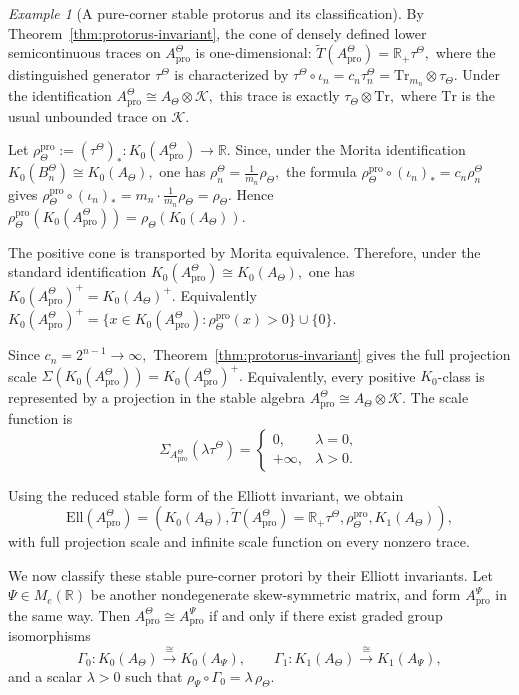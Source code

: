 \documentclass[11pt]{amsart}
\theoremstyle{definition}
\theoremstyle{remark}
\newtheorem{example}[theorem]{Example}
\newcommand{\R}{\mathbb{R}}
\newcommand{\K}{\ensuremath{\mathcal{K}}}
\newcommand{\Tr}{\mathrm{Tr}}
\newcommand{\Ell}{\mathrm{Ell}}
\newcommand{\ex}{\mathrm{pro}}
\begin{document}
\begin{example}[A pure-corner stable protorus and its classification]
By Theorem~\ref{thm:protorus-invariant}, the cone of densely defined lower
semicontinuous traces on \(A_{\ex}^{\Theta}\) is one-dimensional: $\widetilde T(A_{\ex}^{\Theta})=\R_+\tau^\Theta,$
where the distinguished generator $\tau^\Theta$ is characterized by
$\tau^\Theta\circ\iota_n=c_n\tau_n^\Theta=
\Tr_{m_n}\otimes\tau_\Theta.$
Under the identification $A_{\ex}^{\Theta}\cong A_\Theta\otimes\K,$
this trace is exactly $\tau_\Theta\otimes\Tr,$
where $\Tr$ is the usual unbounded trace on $\K$.

Let $\rho_{\Theta}^{\ex}:=(\tau^\Theta)_*
\colon K_0(A_{\ex}^{\Theta})\to\R.$
Since, under the Morita identification $K_0(B_n^\Theta)\cong K_0(A_\Theta),$
one has $
\rho_n^\Theta
=
\frac{1}{m_n}\rho_\Theta,$
the formula $
\rho_{\Theta}^{\ex}\circ(\iota_n)_*=c_n\rho_n^\Theta$
gives $\rho_{\Theta}^{\ex}\circ(\iota_n)_*=
m_n\cdot\frac{1}{m_n}\rho_\Theta=\rho_\Theta.$
Hence $\rho_{\Theta}^{\ex}(K_0(A_{\ex}^{\Theta}))
=
\rho_\Theta(K_0(A_\Theta)).$

The positive cone is transported by Morita equivalence. Therefore, under the
standard identification $K_0(A_{\ex}^{\Theta})\cong K_0(A_\Theta),$
one has $K_0(A_{\ex}^{\Theta})^+
=
K_0(A_\Theta)^+.$
Equivalently $K_0(A_{\ex}^{\Theta})^+
=
\{x\in K_0(A_{\ex}^{\Theta}):\rho_{\Theta}^{\ex}(x)>0\}
\cup\{0\}.$

Since $c_n=2^{n-1}\to\infty,$
Theorem~\ref{thm:protorus-invariant} gives the full projection scale $\Sigma(K_0(A_{\ex}^{\Theta}))
=
K_0(A_{\ex}^{\Theta})^+.$
Equivalently, every positive \(K_0\)-class is represented by a projection in
the stable algebra $A_{\ex}^{\Theta}\cong A_\Theta\otimes\K.$
The scale function is
\[
\Sigma_{A_{\ex}^{\Theta}}(\lambda\tau^\Theta)
=
\begin{cases}
0, & \lambda=0,\\
+\infty, & \lambda>0.
\end{cases}
\]

Using the reduced stable form of the Elliott invariant, we obtain
\[
\Ell(A_{\ex}^{\Theta})
=
\left(
K_0(A_\Theta),
\widetilde T(A_{\ex}^{\Theta})=\mathbb R_+\tau^\Theta,
\rho_{\Theta}^{\ex},
K_1(A_\Theta)
\right),
\]
with full projection scale and infinite scale function on every nonzero trace.

We now classify these stable pure-corner protori by their Elliott invariants.
Let $\Psi\in M_e(\R)$ be another nondegenerate skew-symmetric matrix, and form $A_{\ex}^{\Psi}$ in the same way. Then $A_{\ex}^{\Theta}\cong A_{\ex}^{\Psi}$
if and only if there exist graded group isomorphisms
\[
\Gamma_0\colon K_0(A_\Theta)\xrightarrow{\cong}K_0(A_\Psi),
\qquad
\Gamma_1\colon K_1(A_\Theta)\xrightarrow{\cong}K_1(A_\Psi),
\]
and a scalar $\lambda>0$ such that $\rho_\Psi\circ\Gamma_0=\lambda\,\rho_\Theta.$


\end{example}
\end{document}
